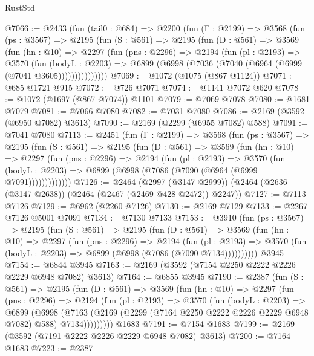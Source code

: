 \begin{lexlean}{RustStd}
\begin{coremodule}
@7066 := @2433
    (fun (tail0 : @684) =>
    @2200
      (fun (Γ : @2199) =>
      @3568
        (fun (ps : @3567) =>
        @2195
          (fun (S : @561) =>
          @2195
            (fun (D : @561) =>
            @3569
              (fun (hn : @10) =>
              @2297
                (fun (pns : @2296) =>
                @2194
                  (fun (pl : @2193) =>
                  @3570
                    (fun (bodyL : @2203) =>
                    @6899 (@6998 (@7036 (@7040 (@6964 (@6999 (@7041 @3605)))))))))))))))
@7069 := @1072 (@1075 (@867 @1124))
@7071 := @685 @1721 @915
@7072 := @726 @7071
@7074 := @1141 @7072 @620
@7078 := @1072 (@1697 (@867 @7074)) @1101
@7079 := @7069 @7078
@7080 := @1681 @7079
@7081 := @7066 @7080
@7082 := @7031 @7080
@7086 := @2169 (@3592 (@6950 @7082) @3613)
@7090 := @2169 (@2299 (@6955 @7082) @588)
@7091 := @7041 @7080
@7113 := @2451
    (fun (Γ : @2199) =>
    @3568
      (fun (ps : @3567) =>
      @2195
        (fun (S : @561) =>
        @2195
          (fun (D : @561) =>
          @3569
            (fun (hn : @10) =>
            @2297
              (fun (pns : @2296) =>
              @2194
                (fun (pl : @2193) =>
                @3570
                  (fun (bodyL : @2203) =>
                  @6899 (@6998 (@7086 (@7090 (@6964 (@6999 @7091)))))))))))))
@7126 := @2464
    (@2997 (@3147 @2999))
    (@2464 (@2636 (@3147 @2638)) (@2464 (@2467 (@2469 @428 @2472)) @2247))
@7127 := @7113 @7126
@7129 := @6962 (@2260 @7126)
@7130 := @2169 @7129
@7133 := @2267 @7126 @5001 @7091
@7134 := @7130 @7133
@7153 := @3910
    (fun (ps : @3567) =>
    @2195
      (fun (S : @561) =>
      @2195
        (fun (D : @561) =>
        @3569
          (fun (hn : @10) =>
          @2297
            (fun (pns : @2296) =>
            @2194
              (fun (pl : @2193) =>
              @3570 (fun (bodyL : @2203) => @6899 (@6998 (@7086 (@7090 @7134))))))))))
    @3945
@7154 := @6844 @3945
@7163 := @2169 (@3592 (@7154 @2250 @2222 @2226 @2229 @6948 @7082) @3613)
@7164 := @6855 @3945
@7190 := @2387
    (fun (S : @561) =>
    @2195
      (fun (D : @561) =>
      @3569
        (fun (hn : @10) =>
        @2297
          (fun (pns : @2296) =>
          @2194
            (fun (pl : @2193) =>
            @3570
              (fun (bodyL : @2203) =>
              @6899
                (@6998
                  (@7163
                    (@2169 (@2299 (@7164 @2250 @2222 @2226 @2229 @6948 @7082) @588) @7134)))))))))
    @1683
@7191 := @7154 @1683
@7199 := @2169 (@3592 (@7191 @2222 @2226 @2229 @6948 @7082) @3613)
@7200 := @7164 @1683
@7223 := @2387

\end{coremodule}
\end{lexlean}

